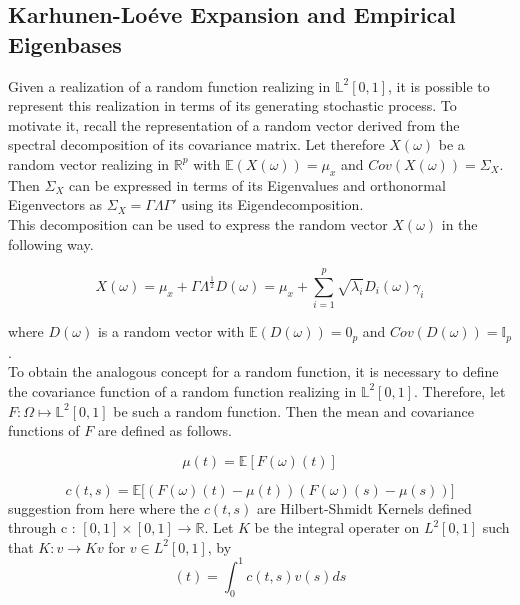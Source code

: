 \documentclass[11pt,twoside,a4paper]{article}
\begin{document}
	\subsection{Karhunen-Lo\'{e}ve Expansion and Empirical Eigenbases}\hypertarget{KL}{}
	Given a realization of a random function realizing in $\mathbb{L}^2[0,1]$, it is possible to represent this realization in terms of its generating stochastic process. To motivate it, recall the representation of a random vector derived from the spectral decomposition of its covariance matrix. Let therefore $X(\omega)$ be a random vector realizing in $\mathbb{R}^{p}$ with $\mathbb{E}(X(\omega)) = \mu_x$ and $Cov(X(\omega)) = \Sigma_X$. Then $\Sigma_X$ can be expressed in terms of its Eigenvalues and orthonormal Eigenvectors as $\Sigma_X = \Gamma \Lambda \Gamma'$ using its Eigendecomposition.\\
		
	This decomposition can be used to express the random vector $X(\omega)$ in the following way.
	
	\begin{equation}
		X(\omega) = \mu_x + \Gamma \Lambda^{\frac{1}{2}} D(\omega) = \mu_x + \sum_{i = 1}^{p} \sqrt{\lambda_i} D_i(\omega) \gamma_i
	\end{equation}
	
	where $D(\omega)$ is a random vector with $\mathbb{E}(D(\omega)) = 0_p$ and $Cov(D(\omega)) = \mathbb{I}_p$.\\
	
	To obtain the analogous concept for a random function, it is necessary to define the covariance function of a random function realizing in $\mathbb{L}^2[0,1]$. Therefore, let $F: \Omega \mapsto \mathbb{L}^2[0,1]$ be such a random function.
	Then the mean and covariance functions of $F$ are defined as follows.
	
	\begin{equation}\label{MeanFunction}
		\mu(t) = \mathbb{E}\left[ F(\omega)(t) \right]
	\end{equation}
	
	\begin{equation}\label{CovarianceFunction}
		c(t,s) = \mathbb{E}\big[ \left( F(\omega)(t) - \mu(t) \right) \left( F(\omega)(s) - \mu(s) \right) \big]
	\end{equation}
	{\color{orange}suggestion from here}
	where the $c(t,s)$ are Hilbert-Shmidt Kernels defined through c : $[0,1] \times [0,1] \rightarrow \mathbb{R}$. Let $K$ be the integral operater on $L^{2}[0,1]$ such that $K : v \rightarrow Kv$ for $v \in L^{2}[0,1]$, by
	\begin{equation}
		[Kv](t) = \int_{0}^{1}c(t,s)v(s)ds
	\end{equation}
\end{document}
